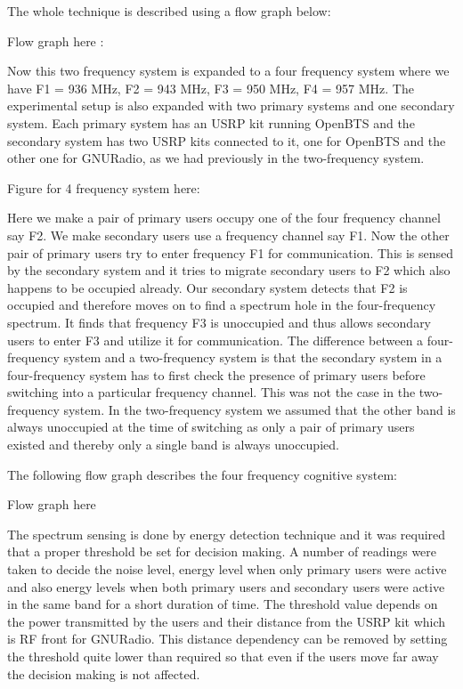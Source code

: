 The whole technique is described using a flow graph below:

Flow graph here :

Now this two frequency system is expanded to a 
four frequency system where we have F1 = 936 MHz, 
F2 = 943 MHz, F3 = 950 MHz, F4 = 957 MHz. The experimental setup
is also expanded with two primary systems and one secondary
system. Each primary system has an USRP kit running OpenBTS and
the secondary system has two USRP kits connected to it, one for OpenBTS
and the other one for GNURadio, as we had previously in the two-frequency 
system.
 
Figure for 4 frequency system here:


Here we make a pair of primary users occupy one of the four
frequency channel say F2. We make secondary users use a frequency channel
say F1. Now the other pair of primary users try to enter frequency
F1 for communication. This is sensed by the secondary system 
and it tries to migrate secondary users to F2 which also happens to be 
occupied already. Our secondary system detects that F2 is occupied and
therefore moves on to find a spectrum hole in the four-frequency 
spectrum. It finds that frequency F3 is unoccupied and thus
allows secondary users to enter F3 and utilize it for communication.
The difference between a four-frequency system and a two-frequency system is 
that the secondary system in a four-frequency
system has to first check the presence of primary users before 
switching into a particular frequency channel.
This was not the case in the two-frequency system. In the
two-frequency system we assumed that the other band is always 
unoccupied at the time of switching as only a pair of primary
users existed and thereby only a single band is always unoccupied.


The following flow graph describes the four frequency cognitive system:

Flow graph here

The spectrum sensing is done by energy detection technique and
it was required that a proper threshold be set for decision making. 
A number of readings were taken to decide the noise level, energy 
level when only primary users were active and also energy levels 
when both primary users and secondary users were active in the same band 
for a short duration of time. The threshold value depends on the
power transmitted by the users and their distance from the USRP 
kit which is RF front for GNURadio. This distance dependency can 
be removed by setting the threshold quite lower than required so 
that even if the users move far away the decision making is not
affected. 






